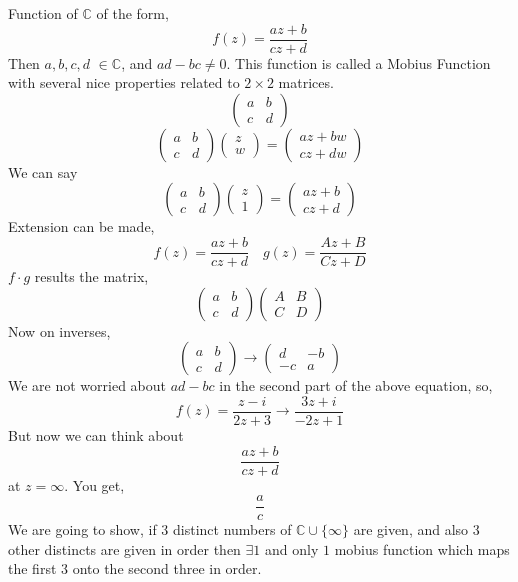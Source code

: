 \documentclass[letter]{article}
\begin{document}
Function of $\mathbb{C}$ of the form, 
\[
f(z) = \frac{az + b}{cz+d}
\] 
Then $a,b,c,d$ $\in  \mathbb{C}$, and $ad - bc \neq  0$. This function is called a  Mobius Function with several nice properties related to $2 \times 2$ matrices.
\[
	\begin{pmatrix} a & b \\ c & d  \end{pmatrix} 
\]
\[
	\begin{pmatrix} a & b \\ c & d  \end{pmatrix} \begin{pmatrix} z \\ w \end{pmatrix} = \begin{pmatrix} az + bw \\ cz + dw  \end{pmatrix} 
\]
We can say
\[
	\begin{pmatrix} a & b \\ c & d  \end{pmatrix} \begin{pmatrix} z \\ 1 \end{pmatrix} = \begin{pmatrix} az + b \\ cz + d  \end{pmatrix} 
\]
Extension can be made, 
\[
f(z) = \frac{az + b}{cz + d} \quad g(z) = \frac{A z + B}{C z + D}
\] 
$f \cdot g$ results the matrix, 
\[
	\begin{pmatrix} a & b \\ c & d  \end{pmatrix} 
	\begin{pmatrix} A & B \\ C & D \end{pmatrix} 
\]
Now on inverses, 
\[
	\begin{pmatrix} a & b \\ c & d \end{pmatrix}  \to 
	\begin{pmatrix} d & -b \\ -c & a \end{pmatrix} 
\]
We are not worried about $ad - bc$ in the second part of the above equation, so, 
\[
f(z) = \frac{z - i}{2z + 3} \to  \frac{3z + i}{-2 z + 1}
\]
But now we can think about
\[
\frac{az + b}{cz + d}
\] at $z = \infty$. You get, 
\[
\frac{a}{c}
\]
We are going to show, if $3$ distinct numbers of $\mathbb{C} \cup \{\infty\} $ are given, and also $3  $ other distincts are given in order then $\exists 1$ and only $1$ mobius function which maps the first 3 onto the second three in order.  
\end{document}
